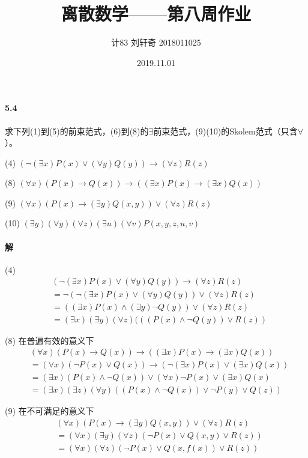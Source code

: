\documentclass[hyperref, UTF8]{ctexart}
\title{离散数学——第八周作业}
\author{计83  刘轩奇  2018011025}
\date{2019.11.01}
\begin{document}
\maketitle

\paragraph{5.4}\label{5.4}
求下列(1)到(5)的前束范式，(6)到(8)的$\exists$前束范式，(9)(10)的Skolem范式（只含$\forall$）。

(4) $( \lnot ( \exists x)P(x) \lor ( \forall y)Q(y)) \rightarrow ( \forall z)R(z) $

(8) $ ( \forall x)(P(x) \rightarrow Q(x)) \rightarrow ( ( \exists x)P(x) \rightarrow ( \exists x)Q(x)) $ 

(9) $ ( \forall x)(P(x) \rightarrow ( \exists y)Q(x,y)) \lor ( \forall z)R(z) $

(10) $ ( \exists y) ( \forall y) ( \forall z) ( \exists u) ( \forall v)P(x,y,z,u,v) $

\paragraph{解}
(4) 
\begin{align*}
    & ( \lnot ( \exists x)P(x) \lor ( \forall y)Q(y)) \rightarrow ( \forall z)R(z) \\
    & = \lnot (\lnot ( \exists x)P(x) \lor ( \forall y)Q(y)) \lor ( \forall z)R(z) \\
    & = ( ( \exists x)P(x) \land ( \exists y) \lnot Q(y)) \lor ( \forall z)R(z) \\
    &= ( \exists x) ( \exists y) ( \forall z)(((P(x) \land \lnot Q(y)) \lor R(z))
\end{align*}

(8) 在普遍有效的意义下
\begin{align*}
    & ( \forall x)(P(x) \rightarrow Q(x)) \rightarrow ( ( \exists x)P(x) \rightarrow ( \exists x)Q(x)) \\
    &= ( \forall x)(\lnot P(x) \lor Q(x)) \rightarrow (\lnot ( \exists x)P(x) \lor ( \exists x)Q(x)) \\
    &= ( \exists x)(P(x) \land \lnot Q(x)) \lor ( \forall x) \lnot P(x) \lor ( \exists x)Q(x) \\
    &= ( \exists x) ( \exists z) ( \forall y)((P(x) \land \lnot Q(x)) \lor \lnot P(y) \lor Q(z))
\end{align*}

(9) 在不可满足的意义下
\begin{align*}
    & ( \forall x)(P(x) \rightarrow ( \exists y)Q(x,y)) \lor ( \forall z)R(z) \\
    &= ( \forall x) ( \exists y) ( \forall z)(\lnot P(x) \lor Q(x,y) \lor R(z)) \\
    &= ( \forall x) ( \forall z)(\lnot P(x) \lor Q(x,f(x)) \lor R(z))
\end{align*}
\end{document}
